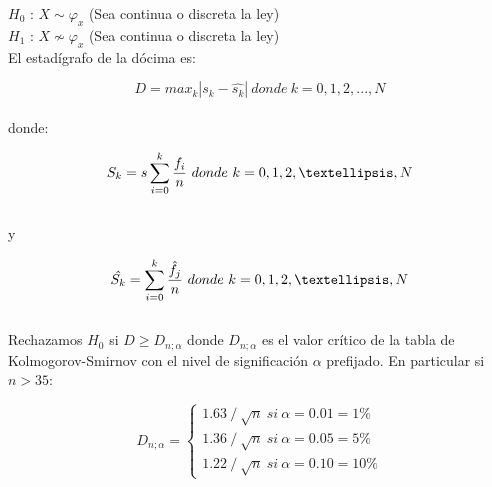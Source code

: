 $H_0$ : $X \sim \varphi_x$  (Sea continua o discreta la ley) \\

$H_1$ : $X \not\sim \varphi_x$ (Sea continua o discreta la ley) \\

El estadígrafo de la dócima es:

\begin{equation}
D = max_k|s_k - \hat{s_k}|\ donde\ k=0,1,2,...,N 
\end{equation}
\\
 donde:
 
\begin{equation}
S_k=s\sum_{i=0}^{k}{f_i \over n}\  donde\ k=0,1,2,…,N
\end{equation}
\\
y

\begin{equation}
\hat{S_k}=\sum_{i=0}^{k}{\hat{f_j} \over n}\ donde\ k=0,1,2,…,N
\end{equation}
\\
Rechazamos $H_0$ si $D\geq D_{n;\alpha}$ donde $D_{n;\alpha}$ es el valor crítico de la tabla de Kolmogorov-Smirnov con el nivel de significación $\alpha$ prefijado. En particular si $ n>35$:


\begin{equation}
D_{n;\alpha}=\left\lbrace\begin{array}{c} 
1.63⁄\sqrt{n}~si~\alpha=0.01=1\% \\ 
1.36⁄\sqrt{n}~si~\alpha=0.05=5\% \\
1.22⁄\sqrt{n}~si~\alpha=0.10=10\%
\end{array}\right.
\end{equation}

















